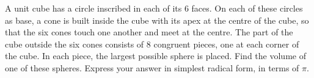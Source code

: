 A unit cube has a circle inscribed in each of its $6$ faces. On each of these circles as base, a cone is built inside the cube with its apex at the centre of the cube, so that the six cones touch one another and meet at the centre. The part of the cube outside the six cones consists of $8$ congruent pieces, one at each corner of the cube. In each piece, the largest possible sphere is placed. Find the volume of one of these spheres. Express your answer in simplest radical form, in terms of $\pi$.
